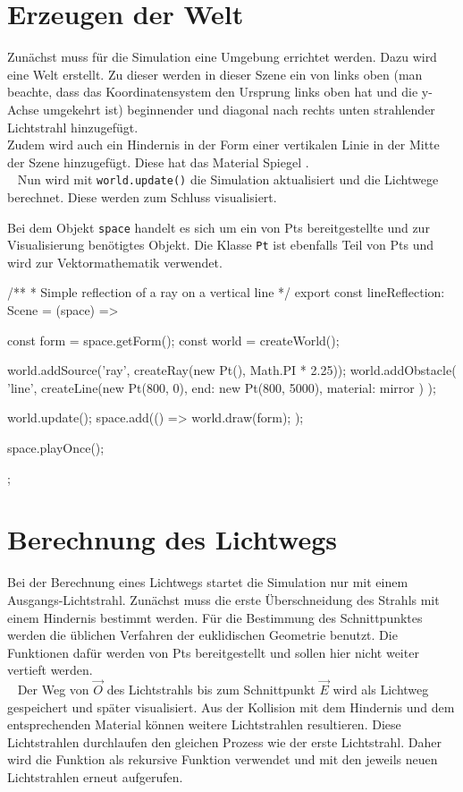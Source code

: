 \section{Erzeugen der Welt}
Zunächst muss für die Simulation eine Umgebung errichtet werden. Dazu wird eine Welt erstellt.
Zu dieser werden in dieser Szene ein von links oben (man beachte, dass das Koordinatensystem den 
Ursprung links oben hat und die y-Achse umgekehrt ist) beginnender und diagonal nach rechts 
unten strahlender Lichtstrahl hinzugefügt. \\
Zudem wird auch ein Hindernis in der Form einer vertikalen Linie in der Mitte der Szene hinzugefügt. 
Diese hat das Material Spiegel . \\ 
Nun wird mit \texttt{world.update()} die Simulation aktualisiert und die Lichtwege berechnet. Diese werden zum Schluss visualisiert.

Bei dem Objekt \texttt{space} handelt es sich um ein von Pts bereitgestellte und zur Visualisierung benötigtes Objekt. 
Die Klasse \texttt{Pt} ist ebenfalls Teil von Pts und wird zur Vektormathematik verwendet.
\newpage

\begin{verbnobox}[\scriptsize\mbox{}]
/**
 * Simple reflection of a ray on a vertical line
 */
export const lineReflection: Scene = (space) => {
    const form = space.getForm();
    const world = createWorld();

    world.addSource('ray', createRay(new Pt(), Math.PI * 2.25));
    world.addObstacle(
        'line',
        createLine(new Pt(800, 0), { end: new Pt(800, 5000), material: mirror })
    );

    world.update();
    space.add(() => {
        world.draw(form);
    });

    space.playOnce();
};
\end{verbnobox}

\section{Berechnung des Lichtwegs}
Bei der Berechnung eines Lichtwegs startet die Simulation nur mit einem Ausgangs-Lichtstrahl.
Zunächst muss die erste Überschneidung des Strahls mit einem Hindernis bestimmt werden. 
Für die Bestimmung des Schnittpunktes werden die üblichen Verfahren der euklidischen Geometrie benutzt. 
Die Funktionen dafür werden von Pts bereitgestellt und sollen hier nicht weiter vertieft werden. \\ 
Der Weg von $ \vec{O} $ des Lichtstrahls bis zum Schnittpunkt $ \vec{E} $ wird als Lichtweg gespeichert und später visualisiert.
Aus der Kollision mit dem Hindernis und dem entsprechenden Material können weitere Lichtstrahlen resultieren. 
Diese Lichtstrahlen durchlaufen den gleichen Prozess wie der erste Lichtstrahl. 
Daher wird die Funktion als rekursive Funktion verwendet und mit den jeweils neuen Lichtstrahlen erneut aufgerufen.


